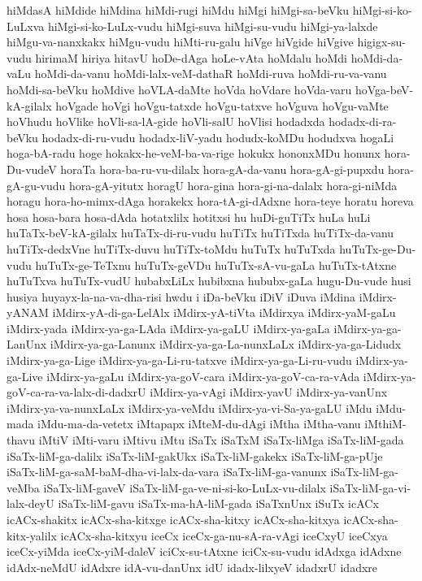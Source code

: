 {hiMdasA
hiMdide
hiMdina
hiMdi-rugi
hiMdu
hiMgi
hiMgi-sa-beVku
hiMgi-si-ko-LuLxva
hiMgi-si-ko-LuLx-vudu
hiMgi-suva
hiMgi-su-vudu
hiMgi-ya-lalxde
hiMgu-va-nanxkakx
hiMgu-vudu
hiMti-ru-galu
hiVge
hiVgide
hiVgive
higigx-su-vudu
hirimaM
hiriya
hitavU
hoDe-dAga
hoLe-vAta
hoMdalu
hoMdi
hoMdi-da-vaLu
hoMdi-da-vanu
hoMdi-lalx-veM-dathaR
hoMdi-ruva
hoMdi-ru-va-vanu
hoMdi-sa-beVku
hoMdive
hoVLA-daMte
hoVda
hoVdare
hoVda-varu
hoVga-beV-kA-gilalx
hoVgade
hoVgi
hoVgu-tatxde
hoVgu-tatxve
hoVguva
hoVgu-vaMte
hoVhudu
hoVlike
hoVli-sa-lA-gide
hoVli-salU
hoVlisi
hodadxda
hodadx-di-ra-beVku
hodadx-di-ru-vudu
hodadx-liV-yadu
hodudx-koMDu
hodudxva
hogaLi
hoga-bA-radu
hoge
hokakx-he-veM-ba-va-rige
hokukx
hononxMDu
honunx
hora-Du-vudeV
horaTa
hora-ba-ru-vu-dilalx
hora-gA-da-vanu
hora-gA-gi-pupxdu
hora-gA-gu-vudu
hora-gA-yitutx
horagU
hora-gina
hora-gi-na-dalalx
hora-gi-niMda
horagu
hora-ho-mimx-dAga
horakekx
hora-tA-gi-dAdxne
hora-teye
horatu
horeva
hosa
hosa-bara
hosa-dAda
hotatxlilx
hotitxsi
hu
huDi-guTiTx
huLa
huLi
huTaTx-beV-kA-gilalx
huTaTx-di-ru-vudu
huTiTx
huTiTxda
huTiTx-da-vanu
huTiTx-dedxVne
huTiTx-duvu
huTiTx-toMdu
huTuTx
huTuTxda
huTuTx-ge-Du-vudu
huTuTx-ge-TeTxnu
huTuTx-geVDu
huTuTx-sA-vu-gaLa
huTuTx-tAtxne
huTuTxva
huTuTx-vudU
hubabxLiLx
hubibxna
hububx-gaLa
hugu-Du-vude
husi
husiya
huyayx-la-na-va-dha-risi
hwdu
i
iDa-beVku
iDiV
iDuva
iMdina
iMdirx-yANAM
iMdirx-yA-di-ga-LelAlx
iMdirx-yA-tiVta
iMdirxya
iMdirx-yaM-gaLu
iMdirx-yada
iMdirx-ya-ga-LAda
iMdirx-ya-gaLU
iMdirx-ya-gaLa
iMdirx-ya-ga-LanUnx
iMdirx-ya-ga-Lanunx
iMdirx-ya-ga-La-nunxLaLx
iMdirx-ya-ga-Lidudx
iMdirx-ya-ga-Lige
iMdirx-ya-ga-Li-ru-tatxve
iMdirx-ya-ga-Li-ru-vudu
iMdirx-ya-ga-Live
iMdirx-ya-gaLu
iMdirx-ya-goV-cara
iMdirx-ya-goV-ca-ra-vAda
iMdirx-ya-goV-ca-ra-va-lalx-di-dadxrU
iMdirx-ya-vAgi
iMdirx-yavU
iMdirx-ya-vanUnx
iMdirx-ya-va-nunxLaLx
iMdirx-ya-veMdu
iMdirx-ya-vi-Sa-ya-gaLU
iMdu
iMdu-mada
iMdu-ma-da-vetetx
iMtapapx
iMteM-du-dAgi
iMtha
iMtha-vanu
iMthiM-thavu
iMtiV
iMti-varu
iMtivu
iMtu
iSaTx
iSaTxM
iSaTx-liMga
iSaTx-liM-gada
iSaTx-liM-ga-dalilx
iSaTx-liM-gakUkx
iSaTx-liM-gakekx
iSaTx-liM-ga-pUje
iSaTx-liM-ga-saM-baM-dha-vi-lalx-da-vara
iSaTx-liM-ga-vanunx
iSaTx-liM-ga-veMba
iSaTx-liM-gaveV
iSaTx-liM-ga-ve-ni-si-ko-LuLx-vu-dilalx
iSaTx-liM-ga-vi-lalx-deyU
iSaTx-liM-gavu
iSaTx-ma-hA-liM-gada
iSaTxnUnx
iSuTx
icACx
icACx-shakitx
icACx-sha-kitxge
icACx-sha-kitxy
icACx-sha-kitxya
icACx-sha-kitx-yalilx
icACx-sha-kitxyu
iceCx
iceCx-ga-nu-sA-ra-vAgi
iceCxyU
iceCxya
iceCx-yiMda
iceCx-yiM-daleV
iciCx-su-tAtxne
iciCx-su-vudu
idAdxga
idAdxne
idAdx-neMdU
idAdxre
idA-vu-danUnx
idU
idadx-lilxyeV
idadxrU
idadxre
}
